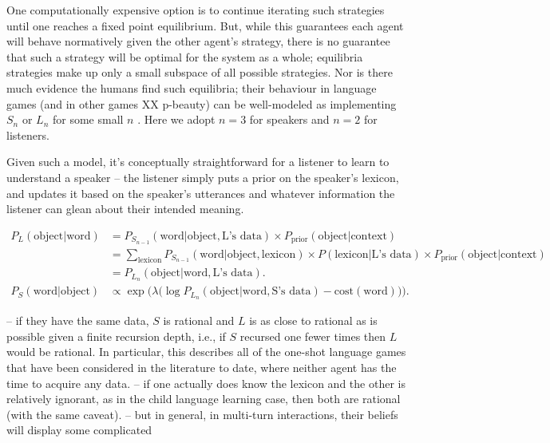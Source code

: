 \documentclass{article} %
\newcommand{\word}{\text{word}}
\newcommand{\obj}{\text{object}}
\newcommand{\lex}{\text{lexicon}}
\newcommand{\prior}{P_{\text{prior}}(\obj | \text{context})}
\begin{document}
One computationally expensive option is to continue iterating such strategies until one reaches a fixed point equilibrium. But, while this guarantees each agent will behave normatively given the other agent's strategy, there is no guarantee that such a strategy will be optimal for the system as a whole; equilibria strategies make up only a small subspace of all possible strategies. Nor is there much evidence the humans find such equilibria; their behaviour in language games (and in other games XX p-beauty) can be well-modeled as implementing $S_n$ or $L_n$ for some small $n$ \cite{frank2012}. Here we adopt $n = 3$ for speakers and $n = 2$ for listeners.

Given such a model, it's conceptually straightforward for a listener to learn to understand a speaker -- the listener simply puts a prior on the speaker's lexicon, and updates it based on the speaker's utterances and whatever information the listener can glean about their intended meaning.

\begin{align*}
  P_L(\obj | \word) &= P_{S_{n-1}}(\word | \obj, \text{L's data}) \times \prior \\
    &= \sum_\lex P_{S_{n-1}}(\word | \obj, \lex) \times P(\lex | \text{L's data}) \times \prior \\
    &= P_{L_n}(\obj | \word, \text{L's data}). \\
  P_S(\word | \obj) &\propto \exp\Big(\lambda \big(\log P_{L_n}(\obj | \word, \text{S's data}) - \text{cost}(\word)\big)\Big).
\end{align*}

-- if they have the same data, $S$ is rational and $L$ is as close to rational as is possible given a finite recursion depth, i.e., if $S$ recursed one fewer times then $L$ would be rational. In particular, this describes all of the one-shot language games that have been considered in the literature to date, where neither agent has the time to acquire any data.
-- if one actually does know the lexicon and the other is relatively ignorant, as in the child language learning case, then both are rational (with the same caveat).
-- but in general, in multi-turn interactions, their beliefs will display some complicated
\end{document}

